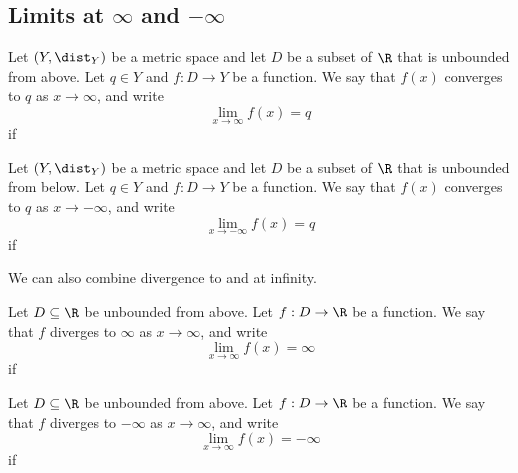 \subsection{Limits at \texorpdfstring{$\infty$}{infinity} and \texorpdfstring{$-\infty$}{minus infinity}}
\begin{definition}
    Let $(Y,\dist_Y)$ be a metric space and let $D$ be a subset of $\R$ that is unbounded from above. Let $q \in Y$ and
    $f: D \to Y$ be a function. We say that $f(x)$ converges to $q$ as $x \to \infty$, and write
    $$\lim_{x\to\infty}f(x) = q$$
    if
    \begin{myCenter}
    \end{myCenter}
\end{definition}
\begin{definition}
    Let $(Y,\dist_Y)$ be a metric space and let $D$ be a subset of $\R$ that is unbounded from below. Let $q \in Y$ and
    $f: D \to Y$ be a function. We say that $f(x)$ converges to $q$ as $x \to -\infty$, and write
    $$\lim_{x\to-\infty}f(x) = q$$
    if
    \begin{myCenter}
    \end{myCenter}
\end{definition}

We can also combine divergence to and at infinity.
\begin{definition}
    Let $D \subseteq \R$ be unbounded from above. Let $f: D \to \R$ be a function. We say that $f$ diverges to $\infty$
    as $x \to \infty$, and write
    $$\lim_{x\to\infty}f(x) = \infty$$
    if
    \begin{myCenter}
    \end{myCenter}
\end{definition}
\begin{definition}
    Let $D \subseteq \R$ be unbounded from above. Let $f: D \to \R$ be a function. We say that $f$ diverges to $-\infty$
    as $x \to \infty$, and write
    $$\lim_{x\to\infty}f(x) = -\infty$$
    if
    \begin{myCenter}
    \end{myCenter}
\end{definition}

